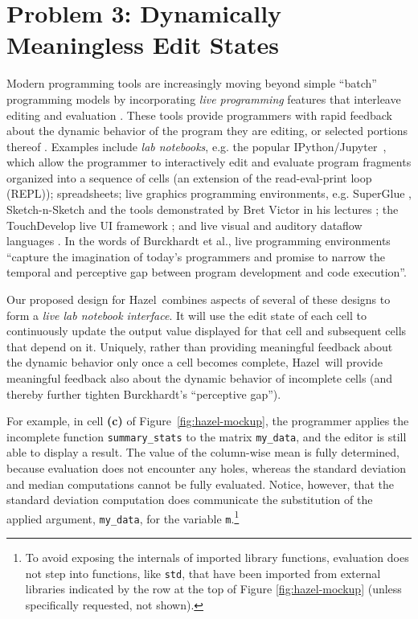 \documentclass[letterpaper,USenglish]{lipics-v2016}
\let\li\lstinline
\newcommand{\Hazel}[0]{\textsf{Hazel}}
\newcommand{\HazelEnv}[0]{\Hazel}
\begin{document}
\section{Problem 3: Dynamically Meaningless Edit States} Modern programming
tools are increasingly moving beyond simple ``batch'' programming models by
incorporating \emph{live programming} features that interleave editing and
evaluation \cite{DBLP:conf/icse/Tanimoto13,DBLP:journals/vlc/Tanimoto90,McDirmid:2007:LUL:1297105.1297073}. These tools provide programmers with rapid feedback about the
dynamic behavior of the program they are editing, or selected portions thereof \cite{McDirmid:2013:ULP:2509578.2509585}. Examples include \emph{lab notebooks},
e.g. the popular IPython/Jupyter~\cite{Perez:2007:ISI:1251563.1251831}, which allow the
programmer to interactively edit and evaluate program fragments organized into a
sequence of cells (an extension of the read-eval-print loop (REPL)); spreadsheets; {live graphics programming environments}, e.g. SuperGlue \cite{McDirmid:2007:LUL:1297105.1297073}, Sketch-n-Sketch \cite{DBLP:conf/pldi/ChughHSA16,DBLP:conf/icse/Chugh25} and the tools demonstrated by Bret Victor in his lectures \cite{victor2012inventing}; the TouchDevelop live UI framework \cite{burckhardt2013s}; and live visual and auditory dataflow languages \cite{DBLP:conf/vl/BurnettAW98}. In the words of Burckhardt et al.\cite{burckhardt2013s}, live programming environments 
``capture the imagination of today's programmers and promise to narrow the temporal and perceptive gap 
between program development and code execution''. 

Our proposed design for \HazelEnv~combines aspects of several of these designs to form a \emph{live lab notebook interface}. 
It will use the edit state of each cell to continuously update the output
value displayed for that cell and subsequent cells that depend on
it. Uniquely, rather than providing meaningful feedback about the dynamic
behavior only once a cell becomes complete, \HazelEnv~will provide meaningful feedback also
about the dynamic behavior of incomplete cells (and thereby further tighten Burckhardt's ``perceptive gap'').

For example, in cell \textbf{(c)} of Figure~\ref{fig:hazel-mockup}, the
programmer applies  the incomplete function \li{summary_stats} to 
the matrix \lstinline{my_data}, and 
the editor is still able to display a result.
The value of the column-wise mean is fully determined, because evaluation does
not encounter any holes, whereas the standard deviation and median computations
cannot be fully evaluated. Notice, however, that the standard
deviation computation does communicate the substitution of the applied argument,
\li{my_data}, for the variable \li{m}.\footnote{To avoid exposing the internals
of imported library functions, evaluation does not step into functions, like
\li{std}, that have been imported from external libraries indicated by the row at the top of Figure \ref{fig:hazel-mockup} (unless specifically
requested, not shown).}
\end{document}
